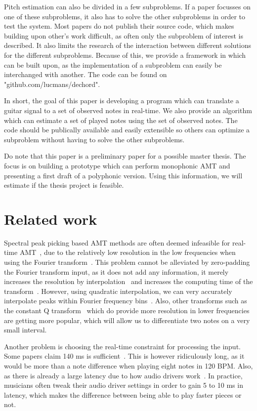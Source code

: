 \documentclass[10pt,twocolumn]{article}
\begin{document}
Pitch estimation can also be divided in a few subproblems. If a paper focusses on one of these subproblems, it also has to solve the other subproblems in order to test the system. Most papers do not publish their source code, which makes building upon other's work difficult, as often only the subproblem of interest is described. It also limits the research of the interaction between different solutions for the different subproblems. Because of this, we provide a framework in which can be built upon, as the implementation of a subproblem can easily be interchanged with another. The code can be found on "github.com/lucmans/dechord".

In short, the goal of this paper is developing a program which can translate a guitar signal to a set of observed notes in real-time. We also provide an algorithm which can estimate a set of played notes using the set of observed notes. The code should be publically available and easily extensible so others can optimize a subproblem without having to solve the other subproblems.

Do note that this paper is a preliminary paper for a possible master thesis. The focus is on building a prototype which can perform monophonic AMT and presenting a first draft of a polyphonic version. Using this information, we will estimate if the thesis project is feasible.


\section{Related work}
Spectral peak picking based AMT methods are often deemed infeasible for real-time AMT~\cite{hater}, due to the relatively low resolution in the low frequencies when using the Fourier transform~\cite{theoretisch}. This problem cannot be alleviated by zero-padding the Fourier transform input, as it does not add any information, it merely increases the resolution by interpolation~\cite{infomax}\cite{infomax2} and increases the computing time of the transform~\cite{boek}. However, using quadratic interpolation, we can very accurately interpolate peaks within Fourier frequency bins~\cite{interpol}. Also, other transforms such as the constant Q transform~\cite{cqt} which do provide more resolution in lower frequencies are getting more popular, which will allow us to differentiate two notes on a very small interval.

Another problem is choosing the real-time constraint for processing the input. Some papers claim 140 ms is sufficient~\cite{sloomboi}. This is however ridiculously long, as it would be more than a note difference when playing eight notes in 120 BPM. Also, as there is already a large latency due to how audio drivers work~\cite{os}. In practice, musicians often tweak their audio driver settings in order to gain 5 to 10 ms in latency, which makes the difference between being able to play faster pieces or not.
\end{document}
